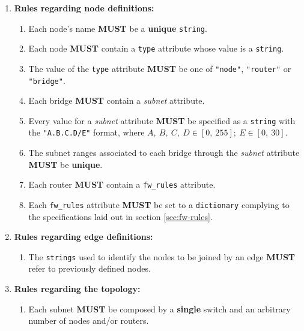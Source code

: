                 \begin{enumerate}
                    \item \textbf{Rules regarding node definitions:}
                    \begin{enumerate}
                        \item Each node's name \textbf{MUST} be a \textbf{unique} \texttt{string}.
                        \item Each node \textbf{MUST} contain a \texttt{type} attribute whose value is a \texttt{string}.
                        \item The value of the \texttt{type} attribute \textbf{MUST} be one of \texttt{"node"}, \texttt{"router"} or \texttt{"bridge"}.
                        \item Each bridge \textbf{MUST} contain a \textit{subnet} attribute.
                        \item Every value for a \textit{subnet} attribute \textbf{MUST} be specified as a \texttt{string} with the \texttt{"A.B.C.D/E"} format, where $A,\ B,\ C,\ D \in [0,\ 255];\ E \in [0,\ 30]$.
                        \item The subnet ranges associated to each bridge through the \textit{subnet} attribute \textbf{MUST} be \textbf{unique}.
                        \item Each router \textbf{MUST} contain a \texttt{fw\_rules} attribute.
                        \item Each \texttt{fw\_rules} attribute \textbf{MUST} be set to a \texttt{dictionary} complying to the specifications laid out in section \ref{sec:fw-rules}.
                    \end{enumerate}
                    \item \textbf{Rules regarding edge definitions:}
                    \begin{enumerate}
                        \item The \texttt{strings} used to identify the nodes to be joined by an edge \textbf{MUST} refer to previously defined nodes.
                    \end{enumerate}
                    \item \textbf{Rules regarding the topology:}
                    \begin{enumerate}
                        \item Each subnet \textbf{MUST} be composed by a \textbf{single} switch and an arbitrary number of nodes and/or routers.
                    \end{enumerate}
                \end{enumerate}

